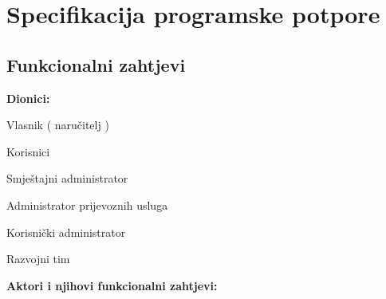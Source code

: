 \chapter{Specifikacija programske potpore}
		
	\section{Funkcionalni zahtjevi}		
	
	\noindent \textbf{Dionici:}
	
	\begin{packed_enum}
		
		\item Vlasnik ( naručitelj )
		\item Korisnici
		\begin{packed_enum}
			\item Smještajni administrator 
			\item Administrator prijevoznih usluga 
			\item Korisnički administrator
		\end{packed_enum}			
		\item Razvojni tim 
		
	\end{packed_enum}
	
	\noindent \textbf{Aktori i njihovi funkcionalni zahtjevi:}
	

